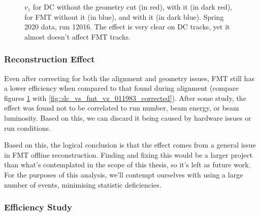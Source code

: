         \begin{figure}[h!]
            \centering{}
            \caption[$v_z$ for DC and FMT, w/ and w/out the geometry cut, run 12016]{$v_z$ for DC without the geometry cut (in red), with it (in dark red), for FMT without it (in blue), and with it (in dark blue). Spring 2020 data, run 12016. The effect is very clear on DC tracks, yet it almost doesn't affect FMT tracks.}
            \label{fig::vz_012016_geomcut}
        \end{figure}

    \subsubsection{Reconstruction Effect}
        Even after correcting for both the alignment and geometry issues, FMT still has a lower efficiency when compared to that found during alignment (compare figures \ref{fig::vz_012016_geomcut} with \ref{fig::dc_vs_fmt_vz_011983_corrected}).
        After some study, the effect was found not to be correlated to run number, beam energy, or beam luminosity.
        Based on this, we can discard it being caused by hardware issues or run conditions.

        Based on this, the logical conclusion is that the effect comes from a general issue in FMT offline reconstruction.
        Finding and fixing this would be a larger project than what's contemplated in the scope of this thesis, so it's left as future work.
        For the purposes of this analysis, we'll contempt ourselves with using a large number of events, minimising statistic deficiencies.

    \subsubsection{Efficiency Study}

